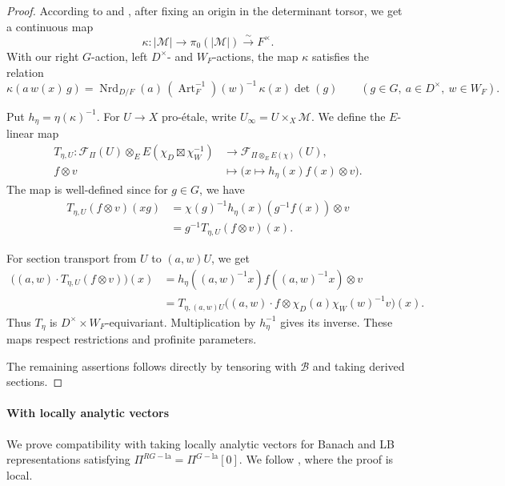 \documentclass[11pt]{article}
\theoremstyle{definition}
\newcommand{\cM}{\mathcal M}
\newcommand{\cF}{\mathcal F}
\newcommand{\la}{\mathrm{la}}
\begin{document}
\begin{proof}
According to \cite[Theorem~4.4]{StrauchComponents} and
\cite[\S4, discussion preceding Proposition~4.4]{MiedaExplicitLLC},
after fixing an origin in the determinant torsor, we get a
continuous map
\[
  \kappa:|\cM|\longrightarrow\pi_0(|\cM|)
 \xrightarrow{\sim}F^\times.
\]
With our right \(G\)-action, left \(D^\times\)- and \(W_F\)-actions,
the map $\kappa$ satisfies the relation
\[
 \kappa(a\,w(x)\,g)
 =
 \operatorname{Nrd}_{D/F}(a)\,
 (\operatorname{Art}_F^{-1})(w)^{-1}\,
 \kappa(x)\det(g)
 \qquad
 (g\in G,\ a\in D^\times,\ w\in W_F).
\]

Put \(h_\eta=\eta(\kappa)^{-1}\). For \(U\to X\) pro-\'etale,
write \(U_\infty=U\times_X\cM\). We define the \(E\)-linear map
\[
 \begin{aligned}
 T_{\eta,U}\colon\cF_\Pi(U)\otimes_E E(\chi_D\boxtimes\chi_W^{-1})
 &\longrightarrow\cF_{\Pi\otimes_E E(\chi)}(U),\\
 f\otimes v&\longmapsto
 \bigl(x\longmapsto h_\eta(x)f(x)\otimes v\bigr).
 \end{aligned}
\]
The map is well-defined since for \(g\in G\), we have
\[
 \begin{aligned}
 T_{\eta,U}(f\otimes v)(xg)
 &=\chi(g)^{-1}h_\eta(x)(g^{-1}f(x))\otimes v\\
 &=g^{-1}T_{\eta,U}(f\otimes v)(x).
 \end{aligned}
\]

For section transport from
\(U\) to \((a,w)U\), we get
\[
 \begin{aligned}
 \bigl((a,w)\cdot T_{\eta,U}(f\otimes v)\bigr)(x)
 &=h_\eta((a,w)^{-1}x)f((a,w)^{-1}x)\otimes v\\
 &=T_{\eta,(a,w)U}\bigl((a,w)\cdot f\otimes
       \chi_D(a)\chi_W(w)^{-1}v\bigr)(x).
 \end{aligned}
\]
Thus \(T_\eta\) is \(D^\times\times W_F\)-equivariant.
Multiplication by \(h_\eta^{-1}\) gives its inverse.
These maps respect restrictions and profinite parameters.

The remaining assertions follows directly by tensoring with $\mathscr{B}$ and taking derived sections.
\end{proof}

\paragraph{With locally analytic vectors} We prove compatibility with taking locally analytic vectors
for Banach and LB representations satisfying $\Pi^{RG-\la}=\Pi^{G-\la}[0]$.
We follow \cite[Theorem~7.2.1]{DRC}, where the proof is local.
\end{document}
